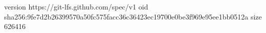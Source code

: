 version https://git-lfs.github.com/spec/v1
oid sha256:9fe7d2b26399570a50fc575facc36c36423ec19700e0be3f969e95ee1bb0512a
size 626416
